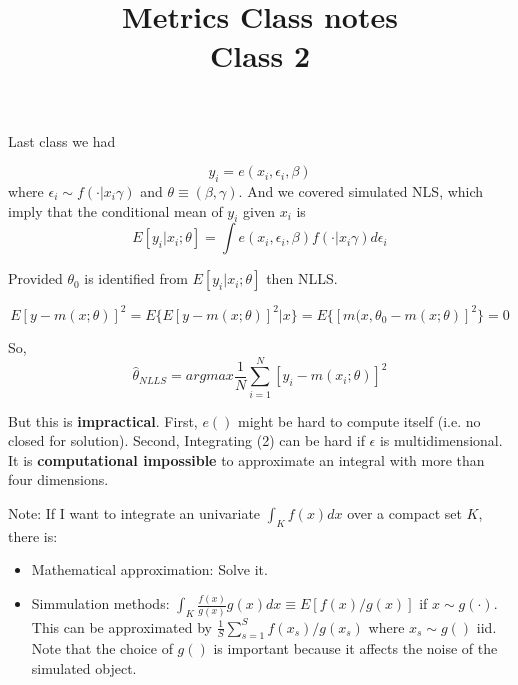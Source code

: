 \documentclass[12pt]{article}
\title{\Large{\textbf{Metrics Class notes}} \\
Class 2}
\begin{document}
\maketitle

Last class we had

\begin{equation}
	y_i = e(x_i, \epsilon_i, \beta)
\end{equation}
	where $\epsilon_i \sim f(\cdot | x_i \gamma )$ and $\theta \equiv (\beta, \gamma)$. And we covered simulated NLS, which imply that the conditional mean of $y_i$ given $x_i$ is
	\begin{equation}
		E[y_i | x_i; \theta] = \int e(x_i, \epsilon_i, \beta) f(\cdot | x_i \gamma ) d \epsilon_i
	\end{equation}

	Provided $\theta_0$ is identified from $E[y_i | x_i; \theta]$ then NLLS.

	\begin{equation}
		E[y - m(x;\theta)]^2 = E \{ E[y - m(x;\theta)]^2 | x \} = E \{ [m(x,\theta_0 - m(x; \theta)]^2 \} = 0
	\end{equation}

	So,
	\begin{equation}
		\hat{\theta}_{NLLS} = argmax \frac{1}{N} \sum^N_{i=1} [y_i - m(x_i; \theta)]^2
	\end{equation}

	But this is \textbf{impractical}. First, $e()$ might be hard to compute itself (i.e. no closed for solution). Second, Integrating (2) can be hard if $\epsilon$ is multidimensional. It is \textbf{computational impossible} to approximate an integral with more than four dimensions.

	Note: If I want to integrate an univariate $\int_K f(x) dx$ over a compact set $K$, there is:
	\begin{itemize}
		\item Mathematical approximation: Solve it.
		\item Simmulation methods: $\int_K \frac{f(x)}{g(x)} g(x) dx \equiv E[f(x)/g(x)]$ if $x \sim g(\cdot)$. This can be approximated by $\frac{1}{S} \sum^S_{s=1} f(x_s)/g(x_s)$ where $x_s \sim g()$ iid. Note that the choice of $g()$ is important because it affects the noise of the simulated object.
	\end{itemize}
\end{document}
